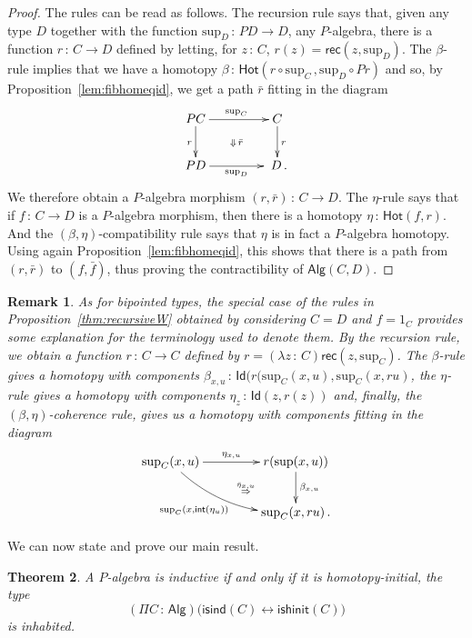 \documentclass[10pt,a4paper,oneside,reqno]{amsart}
\numberwithin{equation}{section}
\theoremstyle{mythm}
\newtheorem{theorem}{Theorem}[section]
\theoremstyle{mydef}
\theoremstyle{myrmk}
\newtheorem{remark}[theorem]{Remark}
\newcommand{\ie}{\text{i.e.\ }}
\newcommand{\co}{\,{:}\,}
\newcommand{\isalgind}{\mathsf{isind}}
\newcommand{\isalghinit}{\mathsf{ishinit}}
\newcommand{\Hot}{\mathsf{Hot}}
\renewcommand{\int}{\mathsf{int}}
\newcommand{\Id}{\mathsf{Id}}
\newcommand{\rec}{\mathsf{rec}}
\newcommand{\Palg}{\mathsf{Alg}}
\renewcommand{\sup}{\mathrm{sup}}
\begin{document}
\begin{proof} The rules can be read as follows. The recursion rule says that, given any type $D$ together 
with the function $\sup_D \co PD \to D$, \ie any $P$-algebra, there is a function $r \co C \to D$
defined by letting,  for $z \co C$, $r(z) = \rec(z, \sup_D)$.  The $\beta$-rule implies that we have a homotopy 
$\beta \co \Hot( r \circ \sup_C \, , \sup_D \circ Pr)$ and so, by Proposition~\ref{lem:fibhomeqid}, we get a path $\bar{r}$ fitting in the diagram
\[
\xymatrix@C=1.5cm{
PC \ar[d]_{r} \ar[r]^{\sup_C} \ar@{}[dr]|{\Downarrow \, \bar{r}} & C \ar[d]^{r} \\
PD \ar[r]_{\sup_D} & \; D \, .}
\]
We therefore obtain a $P$-algebra morphism  $(r, \bar{r}) \co C \to D$.  The 
$\eta$-rule says that if $f \co C \to D$ is a $P$-algebra morphism, then there is a homotopy $\eta \co
\Hot( f, r)$.  
And the $(\beta,\eta)$-compatibility rule says that $\eta$ is in fact a $P$-algebra homotopy. Using again 
Proposition~\ref{lem:fibhomeqid}, this shows that there is a path from $(r, \bar{r})$ to $(f, \bar{f})$, thus
proving the contractibility of $\Palg(C,D)$.
\end{proof}


\begin{remark} As for bipointed types, the special case of the rules in Proposition~\ref{thm:recursiveW} 
obtained by considering $C = D$ and $f = 1_C$ provides some explanation for the terminology used to denote them. 
By the recursion rule, we obtain a function $r \co C \to C$ defined by $r = (\lambda z \co C) \rec(z, \sup_C)$. 
The $\beta$-rule gives a homotopy with components $\beta_{x,u} \co \Id( r (\sup_C(x,u), \sup_C( x, r u)$, 
the $\eta$-rule gives a homotopy with components $\eta_z \co \Id( z, r(z))$ and, finally, the $(\beta, \eta)$-coherence rule, gives us a homotopy with components fitting in the diagram
\[
\xymatrix@C=1.5cm{
\sup_C(x,u) \ar[r]^-{\eta_{x,u}} 
\ar@/_1pc/[dr]_{\sup_C(x, \int(\eta_u)) \qquad}
 \ar@{}[dr]|{\qquad \overset{\bar{\eta}_{x,u}}{\Rightarrow}} &
  r(\sup(x,u)) \ar[d]^{\beta_{x,u}} \\ 
 & \sup_C(x, ru) \, .}
 \]
 \end{remark}



We can now state and prove our main result. 

\begin{theorem}\label{thm:WMain} A $P$-algebra is inductive if and only if
it is homotopy-initial, \ie the type
\[ 
(\Pi C \co \Palg) \big( \isalgind(C) \leftrightarrow \isalghinit(C) \big)
\]
is inhabited. 
\end{theorem}
\end{document}
